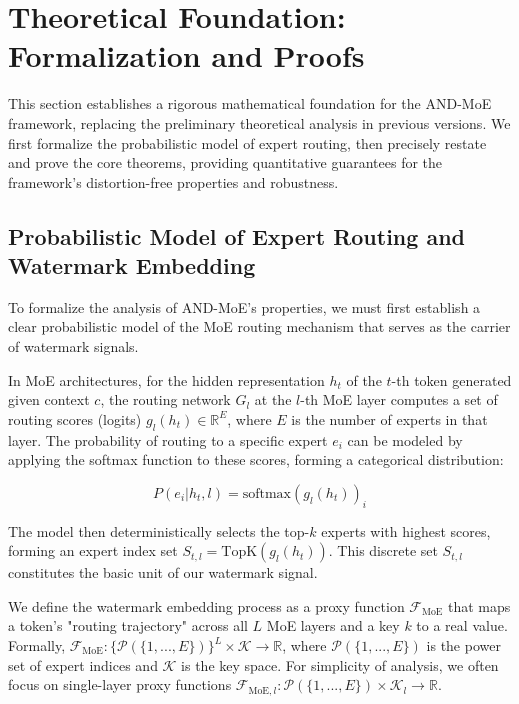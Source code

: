 \documentclass[letterpaper,twocolumn,10pt]{article}
\begin{document}
\section{Theoretical Foundation: Formalization and Proofs}

This section establishes a rigorous mathematical foundation for the AND-MoE framework, replacing the preliminary theoretical analysis in previous versions. We first formalize the probabilistic model of expert routing, then precisely restate and prove the core theorems, providing quantitative guarantees for the framework's distortion-free properties and robustness.

\subsection{Probabilistic Model of Expert Routing and Watermark Embedding}

To formalize the analysis of AND-MoE's properties, we must first establish a clear probabilistic model of the MoE routing mechanism that serves as the carrier of watermark signals.

In MoE architectures, for the hidden representation $h_t$ of the $t$-th token generated given context $c$, the routing network $G_l$ at the $l$-th MoE layer computes a set of routing scores (logits) $g_l(h_t) \in \mathbb{R}^E$, where $E$ is the number of experts in that layer. The probability of routing to a specific expert $e_i$ can be modeled by applying the softmax function to these scores, forming a categorical distribution:

\begin{equation}
P(e_i | h_t, l) = \text{softmax}(g_l(h_t))_i
\end{equation}

The model then deterministically selects the top-$k$ experts with highest scores, forming an expert index set $S_{t,l} = \text{TopK}(g_l(h_t))$. This discrete set $S_{t,l}$ constitutes the basic unit of our watermark signal.

We define the watermark embedding process as a proxy function $\mathcal{F}_{\text{MoE}}$ that maps a token's "routing trajectory" across all $L$ MoE layers and a key $k$ to a real value. Formally, $\mathcal{F}_{\text{MoE}}: \{\mathcal{P}(\{1,...,E\})\}^L \times \mathcal{K} \rightarrow \mathbb{R}$, where $\mathcal{P}(\{1,...,E\})$ is the power set of expert indices and $\mathcal{K}$ is the key space. For simplicity of analysis, we often focus on single-layer proxy functions $\mathcal{F}_{\text{MoE}, l}: \mathcal{P}(\{1,...,E\}) \times \mathcal{K}_l \rightarrow \mathbb{R}$.
\end{document}
